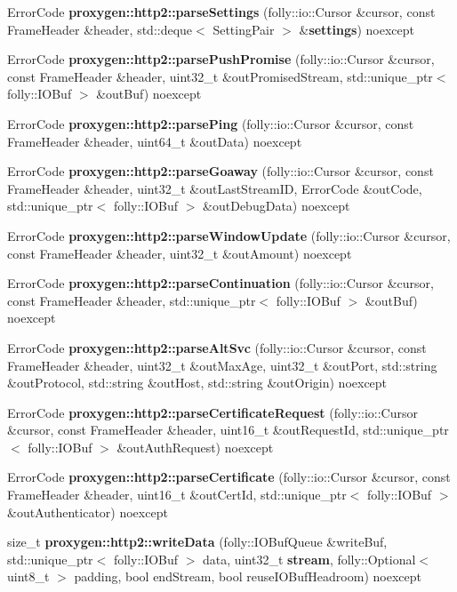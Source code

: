 \begin{DoxyCompactItemize}
\item 
Error\+Code {\bf proxygen\+::http2\+::parse\+Settings} (folly\+::io\+::\+Cursor \&cursor, const Frame\+Header \&header, std\+::deque$<$ Setting\+Pair $>$ \&{\bf settings}) noexcept
\item 
Error\+Code {\bf proxygen\+::http2\+::parse\+Push\+Promise} (folly\+::io\+::\+Cursor \&cursor, const Frame\+Header \&header, uint32\+\_\+t \&out\+Promised\+Stream, std\+::unique\+\_\+ptr$<$ folly\+::\+I\+O\+Buf $>$ \&out\+Buf) noexcept
\item 
Error\+Code {\bf proxygen\+::http2\+::parse\+Ping} (folly\+::io\+::\+Cursor \&cursor, const Frame\+Header \&header, uint64\+\_\+t \&out\+Data) noexcept
\item 
Error\+Code {\bf proxygen\+::http2\+::parse\+Goaway} (folly\+::io\+::\+Cursor \&cursor, const Frame\+Header \&header, uint32\+\_\+t \&out\+Last\+Stream\+ID, Error\+Code \&out\+Code, std\+::unique\+\_\+ptr$<$ folly\+::\+I\+O\+Buf $>$ \&out\+Debug\+Data) noexcept
\item 
Error\+Code {\bf proxygen\+::http2\+::parse\+Window\+Update} (folly\+::io\+::\+Cursor \&cursor, const Frame\+Header \&header, uint32\+\_\+t \&out\+Amount) noexcept
\item 
Error\+Code {\bf proxygen\+::http2\+::parse\+Continuation} (folly\+::io\+::\+Cursor \&cursor, const Frame\+Header \&header, std\+::unique\+\_\+ptr$<$ folly\+::\+I\+O\+Buf $>$ \&out\+Buf) noexcept
\item 
Error\+Code {\bf proxygen\+::http2\+::parse\+Alt\+Svc} (folly\+::io\+::\+Cursor \&cursor, const Frame\+Header \&header, uint32\+\_\+t \&out\+Max\+Age, uint32\+\_\+t \&out\+Port, std\+::string \&out\+Protocol, std\+::string \&out\+Host, std\+::string \&out\+Origin) noexcept
\item 
Error\+Code {\bf proxygen\+::http2\+::parse\+Certificate\+Request} (folly\+::io\+::\+Cursor \&cursor, const Frame\+Header \&header, uint16\+\_\+t \&out\+Request\+Id, std\+::unique\+\_\+ptr$<$ folly\+::\+I\+O\+Buf $>$ \&out\+Auth\+Request) noexcept
\item 
Error\+Code {\bf proxygen\+::http2\+::parse\+Certificate} (folly\+::io\+::\+Cursor \&cursor, const Frame\+Header \&header, uint16\+\_\+t \&out\+Cert\+Id, std\+::unique\+\_\+ptr$<$ folly\+::\+I\+O\+Buf $>$ \&out\+Authenticator) noexcept
\item 
size\+\_\+t {\bf proxygen\+::http2\+::write\+Data} (folly\+::\+I\+O\+Buf\+Queue \&write\+Buf, std\+::unique\+\_\+ptr$<$ folly\+::\+I\+O\+Buf $>$ data, uint32\+\_\+t {\bf stream}, folly\+::\+Optional$<$ uint8\+\_\+t $>$ padding, bool end\+Stream, bool reuse\+I\+O\+Buf\+Headroom) noexcept

\end{DoxyCompactItemize}
